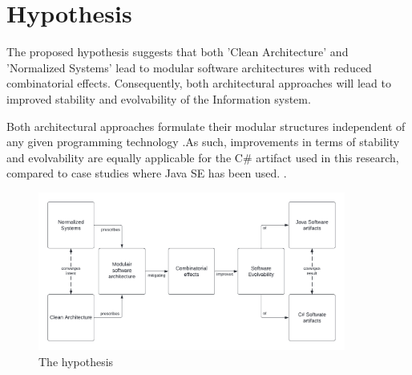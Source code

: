 \section{Hypothesis} \label{hypothesis} 

The proposed hypothesis suggests that both 'Clean Architecture' and 'Normalized Systems' lead
to modular software architectures with reduced combinatorial effects. Consequently, both
architectural approaches will lead to improved stability and evolvability of the
Information system.

Both architectural approaches formulate their modular structures independent of any
given programming technology \parencite[]{mannaert_normalized_2009,martin_clean_2018}.As
such, improvements in terms of stability and evolvability are equally applicable for the
C\# artifact used in this research, compared to case studies where Java SE has been used.
\parencites[]{oorts_building_2014, de_bruyn_enabling_2018}.

\begin{figure}[!ht]
    \centering
    \includegraphics[width=0.9\textwidth]{Figures/hypothesis.pdf}
    \caption[The hypothesis]{The hypothesis}
    \label{fig_hypothesis}
\end{figure}